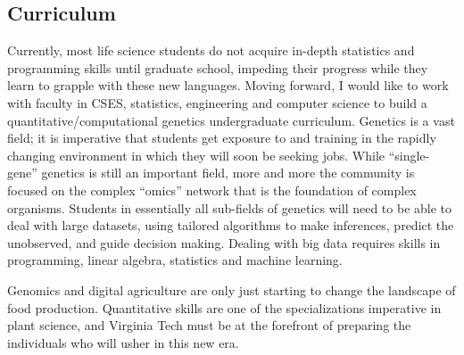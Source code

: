\documentclass[11pt]{article}
\begin{document}
\subsection*{Curriculum}

Currently, most life science students do not acquire in-depth statistics and programming skills until graduate school, impeding their progress while they learn to grapple with these new languages. Moving forward, I would like to work with faculty in CSES, statistics, engineering and computer science to build a quantitative/computational genetics undergraduate curriculum. Genetics is a vast field; it is imperative that students get exposure to and training in the rapidly changing environment in which they will soon be seeking jobs. While ``single-gene'' genetics is still an important field, more and more the community is focused on the complex ``omics'' network that is the foundation of complex organisms. Students in essentially all sub-fields of genetics will need to be able to deal with large datasets, using tailored algorithms to make inferences, predict the unobserved, and guide decision making. Dealing with big data requires skills in programming, linear algebra, statistics and machine learning. 

\medskip

Genomics and digital agriculture are only just starting to change the landscape of food production. Quantitative skills are one of the specializations imperative in plant science, and Virginia Tech must be at the forefront of preparing the individuals who will usher in this new era.

\end{document}
